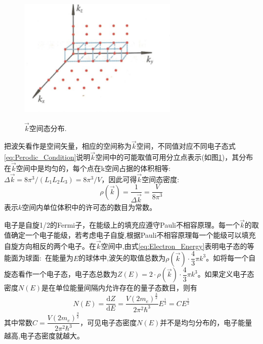 \begin{figure}[h!]
\centering
\vspace*{-0.18in}
\includegraphics[height=2.55in,width=3.0in,viewport=0 0 55 45,clip]{Figures/K_space-discrete.png}
\caption{\small \textrm{$\vec k$空间态分布.}}%
\label{Fig:K_space}
\end{figure}
把波矢看作是空间矢量，相应的空间称为$\vec k$空间，不同值对应不同电子态式\eqref{eq:Perodic_Condition}说明$\vec k$空间中的可能取值可用分立点表示(如图\ref{Fig:K_space})，其分布在$\vec k$空间中是均匀的，每个点在k空间占据的体积相等: $\Delta\vec k=8\pi^3/(L_1L_2L_3)=8\pi^3/V$，因此可得$\vec k$空间态密度:
\begin{equation}
	\rho(\vec k)=\dfrac1{\Delta\vec k}=\dfrac{V}{8\pi^3}
	\label{eq:k-density}
\end{equation}
表示$k$空间内单位体积中的许可态的数目为常数。

电子是自旋1/2的Fermi子，在能级上的填充应遵守Pauli不相容原理。每一个$\vec k$的取值确定一个电子能级，若考虑电子自旋,根据Pauli不相容原理每一个能级可以填充自旋方向相反的两个电子。在$\vec k$空间中,由式\eqref{eq:Electron_Energy}表明电子态的等能面为球面:~在能量为$E$的球体中,波矢的取值总数为$\rho(\vec k)\cdot\dfrac43\pi k^3$。如将每一个自旋态看作一个电子态，电子态总数为$Z(E)=2\cdot \rho(\vec k)\cdot\dfrac43\pi k^3$。如果定义电子态密度$N(E)$是在单位能量间隔内允许存在的量子态数目，则有
\begin{equation}
	N(E)=\dfrac{\mathrm{d}Z}{\mathrm{d}E}=\dfrac{V(2m_e)^{\frac{3}{2}}}{2\pi^2\hbar^3}E^{\frac{1}{2}}=CE^{\frac{1}{2}}
	\label{eq:DOS}
\end{equation}
其中常数$C=\dfrac{V(2m_e)^{\frac{3}{2}}}{2\pi^2\hbar^3}$，可见电子态密度$N(E)$并不是均匀分布的，电子能量越高,电子态密度就越大。


